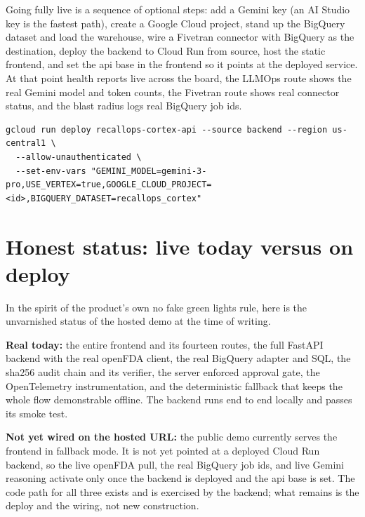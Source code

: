 \documentclass[11pt]{article}
\begin{document}
Going fully live is a sequence of optional steps: add a Gemini key (an AI Studio key is the fastest
path), create a Google Cloud project, stand up the BigQuery dataset and load the warehouse, wire a
Fivetran connector with BigQuery as the destination, deploy the backend to Cloud Run from source,
host the static frontend, and set the api base in the frontend so it points at the deployed service.
At that point health reports live across the board, the LLMOps route shows the real Gemini model and
token counts, the Fivetran route shows real connector status, and the blast radius logs real
BigQuery job ids.

\begin{lstlisting}[style=sh,breakatwhitespace=false,caption={Deploy the backend to Cloud Run from source (no Docker).}]
gcloud run deploy recallops-cortex-api --source backend --region us-central1 \
  --allow-unauthenticated \
  --set-env-vars "GEMINI_MODEL=gemini-3-pro,USE_VERTEX=true,GOOGLE_CLOUD_PROJECT=<id>,BIGQUERY_DATASET=recallops_cortex"
\end{lstlisting}

\section{Honest status: live today versus on deploy}

In the spirit of the product's own no fake green lights rule, here is the unvarnished status of the
hosted demo at the time of writing.

\begin{honestbox}
\textbf{Real today:} the entire frontend and its fourteen routes, the full FastAPI backend with the
real openFDA client, the real BigQuery adapter and SQL, the sha256 audit chain and its verifier, the
server enforced approval gate, the OpenTelemetry instrumentation, and the deterministic fallback that
keeps the whole flow demonstrable offline. The backend runs end to end locally and passes its smoke
test.

\textbf{Not yet wired on the hosted URL:} the public demo currently serves the frontend in fallback
mode. It is not yet pointed at a deployed Cloud Run backend, so the live openFDA pull, the real
BigQuery job ids, and live Gemini reasoning activate only once the backend is deployed and the api
base is set. The code path for all three exists and is exercised by the backend; what remains is the
deploy and the wiring, not new construction.
\end{honestbox}
\end{document}
